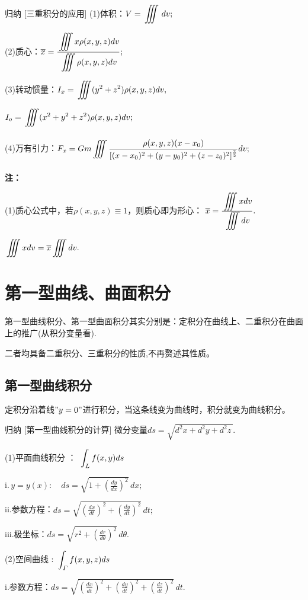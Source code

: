 \documentclass[a4paper,12pt,oneside,fontset=none]{ctexbook}
\let\olddfrac\dfrac
\renewcommand{\dfrac}[2]{
    \olddfrac{#1\vrule width 0pt height 1.15em depth 0em}{#2\vrule width 0pt height 0em depth 0.6em}
}
\let\oldint\int
\renewcommand{\int}{\displaystyle{\vrule width 0pt height 0em depth 0em}\oldint}
\let\oldiiint\iiint
\renewcommand{\iiint}{\displaystyle{\vrule width 0pt height 0em depth 0em}\oldiiint}
\newenvironment{induction}[1][]{\begin{thmBox}{归纳}{#1}}{\end{thmBox}}
\newenvironment{note}{
    \par\vspace{0.5em}\noindent
    \textbf{\color{NoteColor} 注：}
}{
    \par\vspace{0.5em}
}
\numberwithin{equation}{chapter}
\begin{document}
\begin{induction}
    [三重积分的应用]
    (1)体积：$V = \iiint \,dv;$

    (2)质心：$\overline{x} = \dfrac{\iiint x \rho(x,y,z)dv}{\iiint \rho(x,y,z)dv};$

    (3)转动惯量：$I_x = \iiint(y^2 + z^2)\rho(x,y,z)dv,$
    
    $I_o = \iiint(x^2 + y^2 + z^2)\rho(x,y,z)dv;$

    (4)万有引力：$F_x = Gm\iiint \dfrac{\rho(x,y,z)(x-x_0)}{[(x-x_0)^2+(y-y_0)^2+(z-z_0)^2]^{\frac{3}{2}}}dv;$

\end{induction}
\begin{note}
(1)质心公式中，若$\rho(x,y,z)\equiv 1$，则质心即为形心：
$\overline{x} = \frac{\iiint x dv}{\iiint dv}.$

$\iiint x dv = \overline{x} \iiint dv.$
\end{note}


\section{第一型曲线、曲面积分}
第一型曲线积分、第一型曲面积分其实分别是：定积分在曲线上、二重积分在曲面上的推广(从积分变量看).

二者均具备二重积分、三重积分的性质,不再赘述其性质。
\subsection{第一型曲线积分}
定积分沿着线$"y=0"$进行积分，当这条线变为曲线时，积分就变为曲线积分。
\begin{induction}
    [第一型曲线积分的计算]
    微分变量$ds = \sqrt{d^2x + d^2y + d^2z\,}.$

    (1)平面曲线积分 ： $\int_L f(x,y)ds$

    i.$\,y = y(x): \quad ds = \sqrt{1 + \left(\frac{dy}{dx}\right)^2} \, dx;$
    
    ii.参数方程：$ ds = \sqrt{\left(\frac{dx}{dt}\right)^2 + \left(\frac{dy}{dt}\right)^2} \, dt;$

    iii.极坐标：$ds = \sqrt{r^2 + \left(\frac{dr}{d\theta}\right)^2} \, d\theta.$


    (2)空间曲线 : $\int_\varGamma f(x,y,z)ds$

    i.参数方程：$ds = \sqrt{\left(\frac{dx}{dt}\right)^2 + \left(\frac{dy}{dt}\right)^2 + \left(\frac{dz}{dt}\right)^2} \, dt.$
\end{induction}
\end{document}
